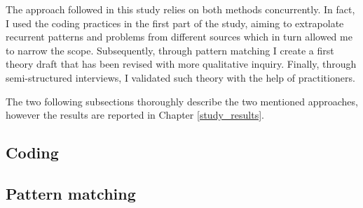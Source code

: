 The approach followed in this study relies on both methods concurrently. In fact, I used the coding practices in the first part of the study, aiming to extrapolate recurrent patterns and problems from different sources which in turn allowed me to narrow the scope. Subsequently, through pattern matching I create a first theory draft that has been revised with more qualitative inquiry. Finally, through semi-structured interviews, I validated such theory with the help of practitioners.

The two following subsections thoroughly describe the two mentioned approaches, however the results are reported in Chapter \ref{study_results}.

\subsection{Coding}


\subsection{Pattern matching}